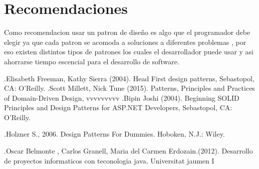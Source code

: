 \documentclass[twoside,twocolumn]{article}
\begin{document}
\section{Recomendaciones}
Como recomendacion usar un patron de diseño es algo que el programador
debe elegir ya que cada patron se acomoda a soluciones a diferentes problemas 
, por eso existen distintos tipos de patrones los cuales el desarrollador puede usar y
 asi ahorrarse tiempo escencial para el desarrollo de software.
\begin{thebibliography}{99} %

\bibitem
.Elisabeth Freeman, Kathy Sierra (2004).
\newblock Head First design patterns,
\newblock Sebastopol,
\newblock CA: O'Reilly.
\bibitem
.Scott Millett, Nick Tune (2015).
\newblock Patterns, Principles and Practices of Domain-Driven Design,
vvvvvvvvv
\bibitem
.Bipin Joshi (2004).
\newblock Beginning SOLID Principles and Design Patterns for ASP.NET Developers,
\newblock Sebastopol,
\newblock CA: O'Reilly.

\bibitem .Holzner
\newblock S., 2006. Design Patterns For Dummies. Hoboken, N.J.: Wiley.
 
\bibitem .Oscar Belmonte 
\newblock , Carlos Granell, Maria del Carmen Erdozain.(2012).
\newblock Desarrollo de proyectos informaticos con teconologia java. Universitat jaumen I
 
\end{thebibliography}

\end{document}
